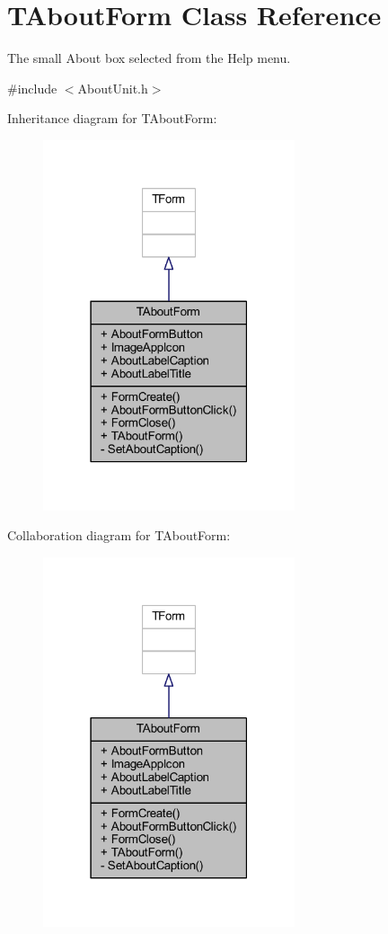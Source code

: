 \hypertarget{class_t_about_form}{}\section{T\+About\+Form Class Reference}
\label{class_t_about_form}


The small \textquotesingle{}About\textquotesingle{} box selected from the Help menu.  




{\ttfamily \#include $<$About\+Unit.\+h$>$}



Inheritance diagram for T\+About\+Form\+:\nopagebreak
\begin{figure}[H]
\begin{center}
\leavevmode
\includegraphics[width=210pt]{class_t_about_form__inherit__graph}
\end{center}
\end{figure}


Collaboration diagram for T\+About\+Form\+:\nopagebreak
\begin{figure}[H]
\begin{center}
\leavevmode
\includegraphics[width=210pt]{class_t_about_form__coll__graph}
\end{center}
\end{figure}
